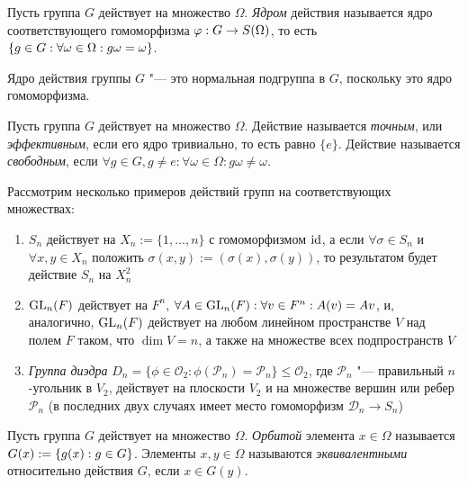 \begin{definition}
	Пусть группа $G$ действует на множество $\Omega$. \textit{Ядром} действия называется ядро соответствующего гомоморфизма $\phi: G \hm\to S(\Omega)$, то есть $\{g \in G: \forall \omega \in \Omega: g\omega \hm= \omega\}$.
\end{definition}

\begin{note}
	Ядро действия группы $G$ "--- это нормальная подгруппа в $G$, поскольку это ядро гомоморфизма.
\end{note}

\begin{definition}
	Пусть группа $G$ действует на множество $\Omega$. Действие называется \textit{точным}, или \textit{эффективным}, если его ядро тривиально, то есть равно $\{e\}$. Действие называется \textit{свободным}, если $\forall g \in G, g\ne e: \forall \omega \in \Omega: g\omega \ne \omega$.
\end{definition}

\begin{example}
	Рассмотрим несколько примеров действий групп на соответствующих множествах:
	\begin{enumerate}
		\item $S_n$ действует на $X_n := \{1, \dotsc, n\}$ с гомоморфизмом $\operatorname{id}$, а если $\forall \sigma \in S_n$ и $\forall x, y \in X_n$ положить $\sigma(x, y) := (\sigma(x), \sigma(y))$, то результатом будет действие $S_n$ на $X_n^2$
		\item $\operatorname{GL}_n(F)$ действует на $F^n$, $\forall A \in \GL_n(F): \forall v \in F^n: A(v) \hm= Av$, и, аналогично, $\operatorname{GL}_n(F)$ действует на любом линейном пространстве $V$ над полем $F$ таком, что $\dim{V} = n$, а также на множестве всех подпространств $V$
		\item \textit{Группа диэдра} $D_n = \{\phi \in \mathcal{O}_2: \phi(\mathcal{P}_n) = \mathcal{P}_n\} \le \mathcal{O}_2$, где $\mathcal{P}_n$ "--- правильный $n$-угольник в $V_2$, действует на плоскости $V_2$ и на множестве вершин или ребер $\mathcal{P}_n$ (в последних двух случаях имеет место гомоморфизм $\mathcal{D}_n \to S_n$)
	\end{enumerate}
\end{example}

\begin{definition}
	Пусть группа $G$ действует на множество $\Omega$. \textit{Орбитой} элемента $x \in \Omega$ называется $G(x) := \{g(x): g \hm\in G\}$. Элементы $x, y \in \Omega$ называются \textit{эквивалентными} относительно действия $G$, если $x \in G(y)$.
\end{definition}

